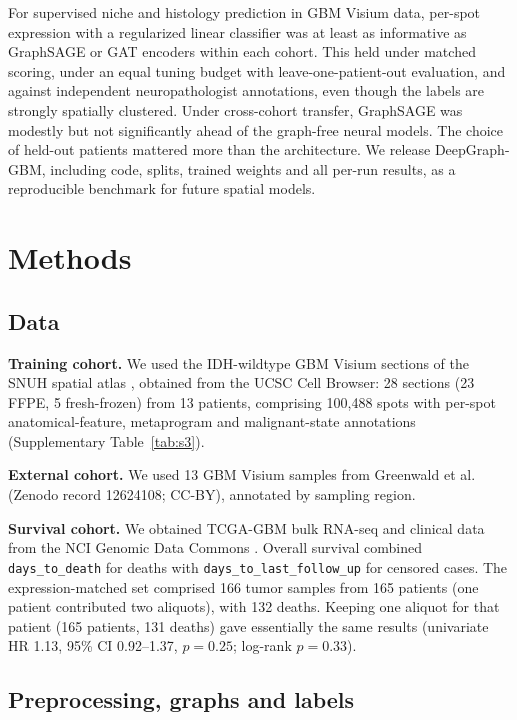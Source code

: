 \documentclass[11pt,letterpaper]{article}
\begin{document}
For supervised niche and histology prediction in GBM Visium data, per-spot expression with a regularized linear classifier was at least as informative as GraphSAGE or GAT encoders within each cohort. This held under matched scoring, under an equal tuning budget with leave-one-patient-out evaluation, and against independent neuropathologist annotations, even though the labels are strongly spatially clustered. Under cross-cohort transfer, GraphSAGE was modestly but not significantly ahead of the graph-free neural models. The choice of held-out patients mattered more than the architecture. We release DeepGraph-GBM, including code, splits, trained weights and all per-run results, as a reproducible benchmark for future spatial models.

\section{Methods}

\subsection{Data}

\textbf{Training cohort.} We used the IDH-wildtype GBM Visium sections of the SNUH spatial atlas \cite{park2026}, obtained from the UCSC Cell Browser: 28 sections (23 FFPE, 5 fresh-frozen) from 13 patients, comprising 100{,}488 spots with per-spot anatomical-feature, metaprogram and malignant-state annotations (Supplementary Table~\ref{tab:s3}).

\textbf{External cohort.} We used 13 GBM Visium samples from Greenwald et al.\ \cite{greenwald2024} (Zenodo record 12624108; CC-BY), annotated by sampling region.

\textbf{Survival cohort.} We obtained TCGA-GBM bulk RNA-seq and clinical data from the NCI Genomic Data Commons \cite{tcga2008}. Overall survival combined \texttt{days\_to\_death} for deaths with \texttt{days\_to\_last\_follow\_up} for censored cases. The expression-matched set comprised 166 tumor samples from 165 patients (one patient contributed two aliquots), with 132 deaths. Keeping one aliquot for that patient (165 patients, 131 deaths) gave essentially the same results (univariate HR 1.13, 95\% CI 0.92--1.37, $p = 0.25$; log-rank $p = 0.33$).

\subsection{Preprocessing, graphs and labels}
\end{document}
